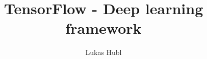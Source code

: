 \documentclass[bachelor,english]{hgbthesis}
\title{TensorFlow - Deep learning framework}
\author{Lukas Hubl}
\begin{document}

\frontmatter							%

\maketitle
\tableofcontents


%

\mainmatter          			%










\appendix                                         %


\MakeBibliography                        				%



\end{document}
